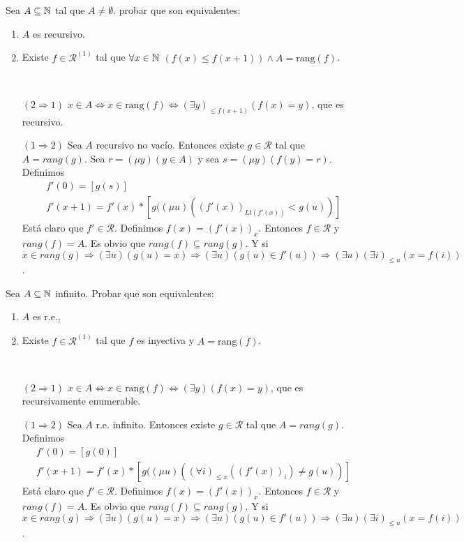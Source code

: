 \documentclass[twoside]{article}
\newcommand{\sii}{{\Leftrightarrow}}
\begin{document}
\begin{ejercicio}{6}
Sea $A \subseteq \mathbb{N}$ tal que $A \neq \emptyset$. probar que son equivalentes:
\begin{enumerate}
	\item $A$ es recursivo.
	\item Existe $f \in \mathcal{R}^{(1)}$ tal que $\forall x \in \mathbb{N}$ $(f(x) ≤ f(x+1)) \land A = \text{rang}(f)$.
\end{enumerate}
\end{ejercicio}
\begin{solucion}\
\begin{itemize}
\item[$(2\Rightarrow 1)$]
$x\in A\sii x\in\text{rang}(f)\Leftrightarrow (\exists y)_{ \leq f(x+1)}(f(x)=y)$, que es recursivo. 
\item[$(1\Rightarrow 2)$]Sea $A$ recursivo no vacío. Entonces existe $g\in\mathcal{R}$ tal que $A=rang(g)$. Sea $r=(\mu y)(y\in A)$ y sea $s=(\mu y)(f(y)=r)$. Definimos
\begin{align*}
&f'(0)=[g(s)]\\
&f'(x+1)=f'(x)*[g((\mu u)((f'(x))_{Lt(f'(x))}< g(u))]
\end{align*}
Está claro que $f'\in\mathcal{R}$. Definimos $f(x)=(f'(x))_x$. Entonces $f\in\mathcal{R}$ y $rang(f)=A$. Es obvio que $rang(f)\subseteq rang(g)$. Y si $x\in rang(g)\Rightarrow(\exists u)(g(u)=x)\Rightarrow (\exists u)(g(u)\in f'(u))\Rightarrow (\exists u)(\exists i)_{\leq u} (x=f(i))$. 
\end{itemize}
\end{solucion}

\newpage

\begin{ejercicio}{7}
Sea $A\subseteq\mathbb{N}$ infinito. Probar que son equivalentes:
\begin{enumerate}
\item $A$ es r.e.,
\item Existe $f\in\mathcal{R}^{(1)}$ tal que $f$ es inyectiva y $A=\text{rang}(f)$.
\end{enumerate}
\end{ejercicio}
\begin{solucion}\
\begin{enumerate}
\item[$(2\Rightarrow 1)$]
$x\in A\sii x\in\text{rang}(f)\Leftrightarrow (\exists y)(f(x)=y)$, que es recursivamente enumerable. 
\item[$(1\Rightarrow 2)$] Sea $A$ r.e. infinito. Entonces existe $g\in\mathcal{R}$ tal que $A=rang(g)$. Definimos
\begin{align*}
&f'(0)=[g(0)]\\
&f'(x+1)=f'(x)*[g((\mu u)((\forall i)_{\leq x} ((f'(x))_i)\neq g(u))]
\end{align*}
Está claro que $f'\in\mathcal{R}$. Definimos $f(x)=(f'(x))_x$. Entonces $f\in\mathcal{R}$ y $rang(f)=A$. Es obvio que $rang(f)\subseteq rang(g)$. Y si $x\in rang(g)\Rightarrow(\exists u)(g(u)=x)\Rightarrow (\exists u)(g(u)\in f'(u))\Rightarrow (\exists u)(\exists i)_{\leq u} (x=f(i))$. 

\end{enumerate}
\end{solucion}
\end{document}
